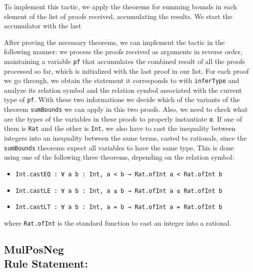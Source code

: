 To implement this tactic, we apply the theorems for summing bounds in each element
of the list of proofs received, accumulating the results. We start the accumulator
with the last

After proving the necessary theorems, we can implement the tactic in the following manner:
we process the proofs received as arguments in reverse order, maintaining a variable \texttt{pf}
that accumulates the combined result of all the proofs processed so far, which is initialized
with the last proof in our list. For each proof we go through, we obtain the statement it corresponds to
with \texttt{inferType} and analyze its relation symbol and the relation symbol associated with the
current type of \texttt{pf}. With these two informations we decide which of the variants of the theorem
\texttt{sumBounds} we can apply in this two proofs. Also, we need to check what are the types of the
variables in these proofs to properly instantiate \texttt{α}. If one of them is \texttt{Rat} and the
other is \texttt{Int}, we also have to cast the inequality between integers into
an inequality between the same terms, casted to rationals, since the \texttt{sumBounds} theorems expect all variables to have the same type. This is done using one of the
following three theorems, depending on the relation symbol:

\begin{itemize}
  \item \texttt{Int.castEQ : ∀ {a b : Int}, a < b → Rat.ofInt a < Rat.ofInt b}
  \item \texttt{Int.castLE : ∀ {a b : Int}, a ≤ b → Rat.ofInt a ≤ Rat.ofInt b}
  \item \texttt{Int.castLT : ∀ {a b : Int}, a = b → Rat.ofInt a = Rat.ofInt b}
\end{itemize}

where \texttt{Rat.ofInt} is the standard function to cast an integer into a rational.

\subsection{MulPosNeg\\Rule Statement:}



